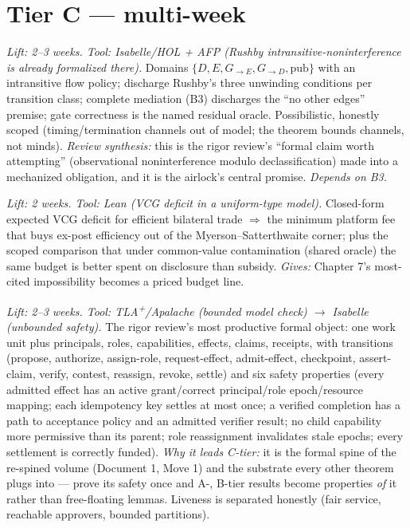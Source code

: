 \documentclass[11pt,a4paper]{article}
\begin{document}
\section{Tier C --- multi-week}
\begin{description}[leftmargin=0em,style=unboxed]
\item[C1. Sealed-Harbor noninterference via unwinding.] \emph{Lift: 2--3 weeks. Tool: Isabelle/HOL + AFP (Rushby intransitive-noninterference is already formalized there).} Domains $\{D,E,G_{\to E},G_{\to D},\text{pub}\}$ with an intransitive flow policy; discharge Rushby's three unwinding conditions per transition class; complete mediation (B3) discharges the ``no other edges'' premise; gate correctness is the named residual oracle. Possibilistic, honestly scoped (timing/termination channels out of model; the theorem bounds channels, not minds). \emph{Review synthesis:} this is the rigor review's ``formal claim worth attempting'' (observational noninterference modulo declassification) made into a mechanized obligation, and it is the airlock's central promise. \emph{Depends on B3.}

\item[C2. Minimum viable take-rate.] \emph{Lift: 2 weeks. Tool: Lean (VCG deficit in a uniform-type model).} Closed-form expected VCG deficit for efficient bilateral trade $\Rightarrow$ the minimum platform fee that buys ex-post efficiency out of the Myerson--Satterthwaite corner; plus the scoped comparison that under common-value contamination (shared oracle) the same budget is better spent on disclosure than subsidy. \emph{Gives:} Chapter 7's most-cited impossibility becomes a priced budget line.

\item[C0 (new). The work-unit transition system.] \emph{Lift: 2--3 weeks. Tool: TLA\textsuperscript{+}/Apalache (bounded model check) $\to$ Isabelle (unbounded safety).} The rigor review's most productive formal object: one work unit plus principals, roles, capabilities, effects, claims, receipts, with transitions (propose, authorize, assign-role, request-effect, admit-effect, checkpoint, assert-claim, verify, contest, reassign, revoke, settle) and six safety properties (every admitted effect has an active grant/correct principal/role epoch/resource mapping; each idempotency key settles at most once; a verified completion has a path to acceptance policy and an admitted verifier result; no child capability more permissive than its parent; role reassignment invalidates stale epochs; every settlement is correctly funded). \emph{Why it leads C-tier:} it is the formal spine of the re-spined volume (Document 1, Move 1) and the substrate every other theorem plugs into --- prove its safety once and A-, B-tier results become properties \emph{of} it rather than free-floating lemmas. Liveness is separated honestly (fair service, reachable approvers, bounded partitions).
\end{description}
\end{document}
